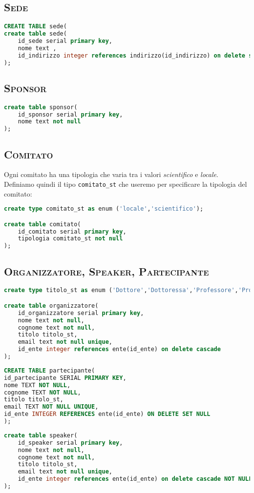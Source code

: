 \subsection{\textsc{Sede}}
\begin{lstlisting}[language=SQL,style=mystyle,caption={Tabella:  Sede}]
CREATE TABLE sede(
create table sede(
    id_sede serial primary key,
    nome text ,
    id_indirizzo integer references indirizzo(id_indirizzo) on delete set null
);
\end{lstlisting}
\subsection{\textsc{Sponsor}}
\begin{lstlisting}[language=SQL,style=mystyle,caption={Tabella: Sponsor}]
create table sponsor(
    id_sponsor serial primary key,
    nome text not null
);
\end{lstlisting}
\subsection{\textsc{Comitato}}
Ogni comitato ha una tipologia che varia tra i valori \textit{scientifico} e \textit{locale}. Definiamo quindi il tipo \texttt{comitato\_st} che useremo per specificare la tipologia del comitato:
\begin{lstlisting}[language=SQL,style=mystyle,caption={Tabella: Comitato}]
create type comitato_st as enum ('locale','scientifico');

create table comitato(
    id_comitato serial primary key,
    tipologia comitato_st not null
);
\end{lstlisting}
\subsection{\textsc{Organizzatore, Speaker, Partecipante}}
\begin{lstlisting}[language=SQL,style=mystyle,caption={Tabella: Organizzatore}]
create type titolo_st as enum ('Dottore','Dottoressa','Professore','Professoressa','Assistente','Ricercatore','Ricercatrice','Ingegnere');

create table organizzatore(
    id_organizzatore serial primary key,
    nome text not null,
    cognome text not null,
    titolo titolo_st,
    email text not null unique,
    id_ente integer references ente(id_ente) on delete cascade
);
\end{lstlisting}
\begin{lstlisting}[language=SQL,style=mystyle,caption={Tabella: Partecipante}]
CREATE TABLE partecipante(
id_partecipante SERIAL PRIMARY KEY,
nome TEXT NOT NULL,
cognome TEXT NOT NULL,
titolo titolo_st,
email TEXT NOT NULL UNIQUE, 
id_ente INTEGER REFERENCES ente(id_ente) ON DELETE SET NULL
);
\end{lstlisting}
\begin{lstlisting}[language=SQL,style=mystyle, caption={Tabella: Speaker}]
create table speaker(
    id_speaker serial primary key,
    nome text not null,
    cognome text not null,
    titolo titolo_st,
    email text not null unique,
    id_ente integer references ente(id_ente) on delete cascade NOT NULL
);

\end{lstlisting}
